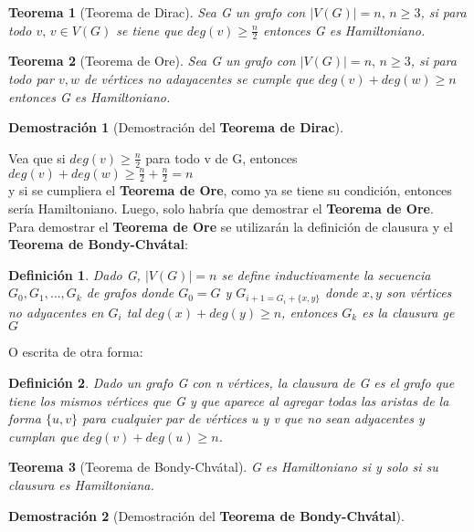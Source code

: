 \documentclass[a4paper,1pt]{report}
\newtheorem*{teo}{Teorema}
\newtheorem*{dem}{Demostración}
\newtheorem*{dfn}{Definición}
\begin{document}
\begin{teo}[Teorema de Dirac]
 Sea G un grafo con $|V(G)|=n,\, n\geq3$, si para todo $v,\, v\in V(G)$ se tiene que $deg(v)\geq \frac{n}{2}$ entonces G es Hamiltoniano.
\end{teo}

\begin{teo}[Teorema de Ore]
Sea G un grafo con $|V(G)|=n,\, n\geq3$, si para todo par $v,w$ de vértices no adayacentes se cumple que $deg(v)+deg(w)\geq n$ entonces G es Hamiltoniano.
\end{teo}
 
 \begin{dem}[Demostración del \textbf{Teorema de Dirac}] \end{dem}
 Vea que si $deg(v)\geq \frac{n}{2}$ para todo v de G, entonces\\ 
 
 $deg(v)+deg(w)\geq \frac{n}{2}+\frac{n}{2}=n$ \\
 
 y si se cumpliera el \textbf{Teorema de Ore}, como ya se tiene su condición, entonces sería Hamiltoniano. Luego, solo habría que demostrar el \textbf{Teorema de Ore}.\\
  
 Para demostrar el \textbf{Teorema de Ore} se utilizarán la definición de clausura y el \textbf{Teorema de Bondy-Chvátal}:
 
  \begin{dfn}
 Dado G, $|V(G)|=n$ se define inductivamente la secuencia $G_0,G_1,\dots,G_k$ de grafos donde
 $G_0=G$ y $G_{i+1=G_i+\{x,y\}}$ donde $x,y$ son vértices no adyacentes en $G_i$ tal $deg(x)+deg(y)\geq n$, entonces $G_k$ es la clausura ge $G$
 \end{dfn}
 
 O escrita de otra forma:
 
  \begin{dfn}
  Dado un grafo G con n vértices, la clausura de G es el grafo que tiene los mismos vértices que G y que aparece al agregar todas las aristas de la forma $\{u, v\}$ para cualquier par de vértices u y v que no sean adyacentes y cumplan que 
  $deg(v) + deg(u)\geq n$.
 \end{dfn}
 
 \begin{teo}[Teorema de Bondy-Chvátal]
  G es Hamiltoniano si y solo si su clausura es Hamiltoniana.
 \end{teo}

  \begin{dem}[Demostración del \textbf{Teorema de Bondy-Chvátal}] \end{dem}
\end{document}
